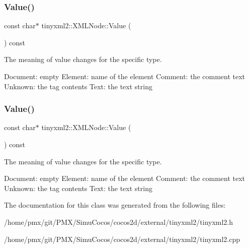 \mbox{\label{classtinyxml2_1_1XMLNode_a66344989a4b436155bcda72bd6b07b82}} 
\subsubsection{\texorpdfstring{Value()}{Value()}\hspace{0.1cm}{\footnotesize\ttfamily [1/2]}}
{\footnotesize\ttfamily const char$\ast$ tinyxml2\+::\+X\+M\+L\+Node\+::\+Value (\begin{DoxyParamCaption}{ }\end{DoxyParamCaption}) const\hspace{0.3cm}{\ttfamily [inline]}}

The meaning of \textquotesingle{}value\textquotesingle{} changes for the specific type. \begin{DoxyVerb}Document:   empty
Element:    name of the element
Comment:    the comment text
Unknown:    the tag contents
Text:       the text string
\end{DoxyVerb}
 \mbox{\label{classtinyxml2_1_1XMLNode_a66344989a4b436155bcda72bd6b07b82}} 
\subsubsection{\texorpdfstring{Value()}{Value()}\hspace{0.1cm}{\footnotesize\ttfamily [2/2]}}
{\footnotesize\ttfamily const char$\ast$ tinyxml2\+::\+X\+M\+L\+Node\+::\+Value (\begin{DoxyParamCaption}{ }\end{DoxyParamCaption}) const\hspace{0.3cm}{\ttfamily [inline]}}

The meaning of \textquotesingle{}value\textquotesingle{} changes for the specific type. \begin{DoxyVerb}Document:   empty
Element:    name of the element
Comment:    the comment text
Unknown:    the tag contents
Text:       the text string
\end{DoxyVerb}
 

The documentation for this class was generated from the following files\+:\begin{DoxyCompactItemize}
\item 
/home/pmx/git/\+P\+M\+X/\+Simu\+Cocos/cocos2d/external/tinyxml2/tinyxml2.\+h\item 
/home/pmx/git/\+P\+M\+X/\+Simu\+Cocos/cocos2d/external/tinyxml2/tinyxml2.\+cpp\end{DoxyCompactItemize}

